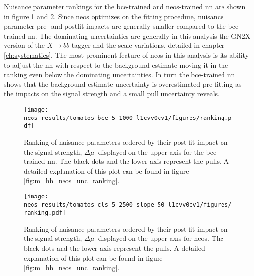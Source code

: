 Nuisance parameter rankings for the \ac{bce}-trained and neos-trained \ac{nn} are shown in figure \ref{fig:neos_valid_ranking_bce} and \ref{fig:neos_valid_ranking_cls}. Since \ac{neos} optimizes on the fitting procedure, nuisance parameter pre- and postfit impacts are generally smaller compared to the \ac{bce}-trained \ac{nn}. The dominating uncertainties are generally in this analysis the GN2X version of the $X\rightarrow bb$ tagger and the scale variations, detailed in chapter \ref{ch:systematics}. The most prominent feature of \ac{neos} in this analysis is its ability to adjust the \ac{nn} with respect to the background estimate moving it in the ranking even below the dominating uncertainties. In turn the \ac{bce}-trained \ac{nn} shows that the background estimate uncertainty is overestimated pre-fitting as the impacts on the signal strength and a small pull uncertainty reveals.

\begin{figure}
    \centering
    \texttt{[image: neos\_results/tomatos\_bce\_5\_1000\_l1cvv0cv1/figures/ranking.pdf]}
    \caption[]{Ranking of nuisance parameters ordered by their post-fit impact on the signal strength, $\Delta\mu$, displayed on the upper axis for the \ac{bce}-trained \ac{nn}. The black dots and the lower axis represent the pulls. A detailed explanation of this plot can be found in figure \ref{fig:m_hh_neos_unc_ranking}.}
    \label{fig:neos_valid_ranking_bce}
\end{figure}
\begin{figure}
    \centering
    \texttt{[image: neos\_results/tomatos\_cls\_5\_2500\_slope\_50\_l1cvv0cv1/figures/ranking.pdf]}
    \caption[]{Ranking of nuisance parameters ordered by their post-fit impact on the signal strength, $\Delta\mu$, displayed on the upper axis for \ac{neos}. The black dots and the lower axis represent the pulls. A detailed explanation of this plot can be found in figure \ref{fig:m_hh_neos_unc_ranking}.}
    \label{fig:neos_valid_ranking_cls}
\end{figure}

